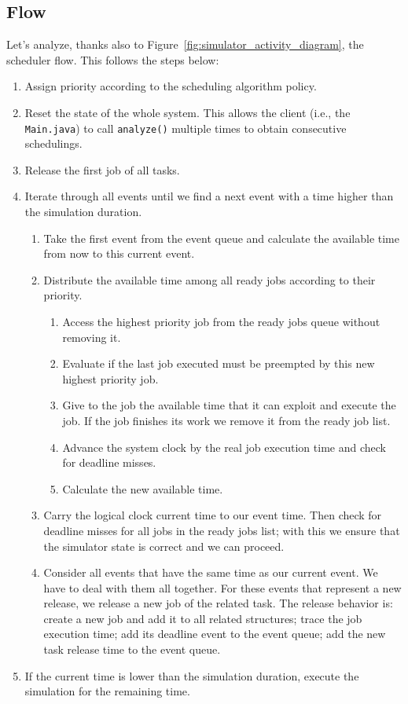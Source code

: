 \subsection{Flow}
Let's analyze, thanks also to Figure~\ref{fig:simulator_activity_diagram}, the scheduler flow. This follows the steps below:
\begin{enumerate}
    \item Assign priority according to the scheduling algorithm policy.
    \item Reset the state of the whole system. This allows the client (i.e., the \texttt{Main.java}) to call \texttt{analyze()} multiple times to obtain consecutive schedulings.
    \item Release the first job of all tasks.
    \item Iterate through all events until we find a next event with a time higher than the simulation duration.
    \begin{enumerate}
        \item Take the first event from the event queue and calculate the available time from now to this current event.
        \item Distribute the available time among all ready jobs according to their priority.
        \begin{enumerate}
            \item Access the highest priority job from the ready jobs queue without removing it.
            \item Evaluate if the last job executed must be preempted by this new highest priority job.
            \item Give to the job the available time that it can exploit and execute the job. If the job finishes its work we remove it from the ready job list.
            \item Advance the system clock by the real job execution time and check for deadline misses.
            \item Calculate the new available time.
        \end{enumerate}
        \item Carry the logical clock current time to our event time. Then check for deadline misses for all jobs in the ready jobs list; with this we ensure that the simulator state is correct and we can proceed.
        \item Consider all events that have the same time as our current event. We have to deal with them all together. For these events that represent a new release, we release a new job of the related task. The release behavior is: create a new job and add it to all related structures; trace the job execution time; add its deadline event to the event queue; add the new task release time to the event queue.
    \end{enumerate}
    \item If the current time is lower than the simulation duration, execute the simulation for the remaining time.
\end{enumerate}

